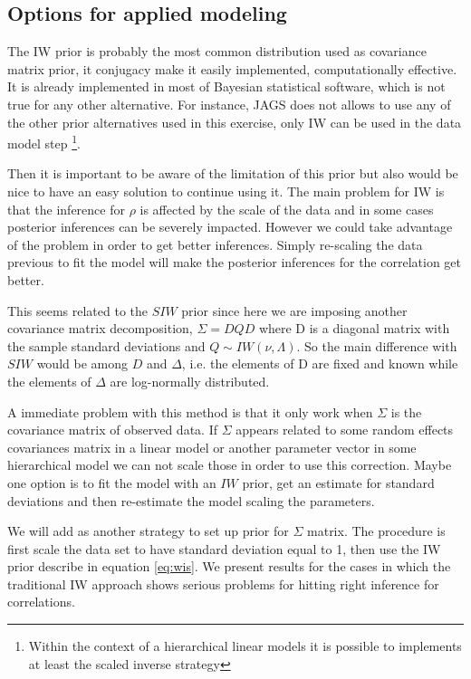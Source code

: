 \documentclass[a4paper]{article}
\begin{document}
\subsection{Options for applied modeling}

The IW prior is probably the most common distribution used as covariance matrix prior, it conjugacy make it easily implemented, computationally effective. It is already implemented in most of Bayesian statistical software, which is not true for any other alternative. For instance, JAGS does not allows to use any of the other prior alternatives used in this exercise, only IW can be used in the data model step \footnote{Within the context of a hierarchical linear models it is possible to implements at least the scaled inverse strategy}.  

Then it is important to be aware of the limitation of this prior but also would be nice to have an easy solution to continue using it. The main problem for IW is that the inference for $\rho$ is affected by the scale of the data and in some cases posterior inferences can be severely impacted. However we could take advantage of the problem in order to get better inferences. Simply re-scaling the data previous to fit the model will make the posterior inferences for the correlation get better. 

This seems related to the $SIW$ prior since here we are imposing another covariance matrix decomposition, $\Sigma = DQD$ where D is a diagonal matrix with the sample standard deviations and $Q\sim IW(\nu, \Lambda)$. So the main difference with $SIW$ would be among $D$ and $\Delta$, i.e. the elements of D are fixed and known while the elements of $\Delta$ are log-normally distributed. 

A immediate problem with this method is that it only work when $\Sigma$ is the covariance matrix of observed data. If $\Sigma$ appears related to some random effects covariances matrix in a linear model or another parameter vector in some hierarchical model we can not scale those in order to use this correction.  Maybe one option is to fit the model with an $IW$ prior, get an estimate for standard deviations and then re-estimate the model scaling the parameters.

We will add as another strategy to set up prior for $\Sigma$ matrix. The procedure is first scale the data set to have standard deviation equal to 1, then use the IW prior describe in equation \ref{eq:wis}. We present results for the cases in which the traditional IW approach shows serious problems for hitting right inference for correlations. 
\end{document}
